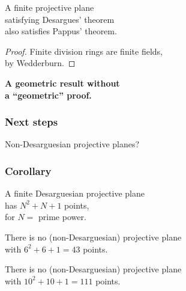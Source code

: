 \documentclass[14pt]{chalkfjord}
\newcommand{\clearbackgroundpicture}{\usebackgroundtemplate{}}
\begin{document}
\begin{frame}
  \begin{theorem}
    A finite projective plane \\
    \quad satisfying Desargues' theorem \\
    \quad also satisfies Pappus' theorem.
  \end{theorem}
  \pause
  \begin{proof}
    Finite division rings are finite fields,\\
    \quad by Wedderburn.
  \end{proof}
  \pause
  \vfill
  \textbf{A geometric result without\\
    \quad a ``geometric'' proof.}

\end{frame}

\begin{frame}
  \frametitle{Next steps}

  \vfill

  \begin{center}
    Non-Desarguesian projective planes?
  \end{center}
  
  \vfill
\end{frame}

\begin{frame}
  \frametitle{Corollary}

  A finite Desarguesian projective plane \\
  \quad has $N^2 + N + 1$ points,\\
  \quad for $N = $ prime power.

  \vfill\pause

  \begin{theorem}
    There is no (non-Desarguesian) projective plane \\
    \quad with $6^2 + 6 + 1 = 43$ points.
  \end{theorem}

  \vfill\pause

  \begin{theorem}
    There is no (non-Desarguesian) projective plane \\
    \quad with $10^2 + 10 + 1 = 111$ points.
  \end{theorem}

\end{frame}

 \clearbackgroundpicture
\begin{frame}[label=why-me]
  \vfill
  \begin{center}
  \end{center}
  \vfill
\end{frame}
\end{document}
